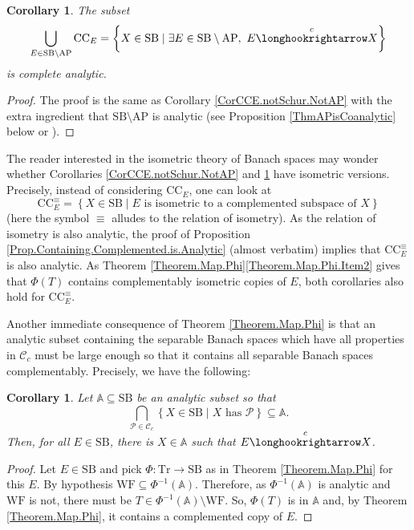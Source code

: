\documentclass[letterpaper]{amsart}
\numberwithin{equation}{section}
\newtheorem{corollary}[theorem]{Corollary}
\theoremstyle{definition}
\newcommand{\WF}{\mathrm{WF}}
\newcommand{\Tr}{\mathrm{Tr}}
\newcommand{\SB}{\mathrm{SB}}
\newcommand{\AP}{\mathrm{AP}}
\begin{document}
\begin{corollary}\label{Corollary.CCE.anyE.CA}
The subset \[\bigcup_{E\in \SB\setminus \AP} \mathrm{CC}_E=\left\{X\in \SB\mid \exists E\in\SB\setminus \AP,\ E\overset{c}{\longhookrightarrow} X\right\}\]    is complete analytic. 
\end{corollary}

\begin{proof}
    The proof is the same as Corollary \ref{CorCCE.notSchur.NotAP} with the extra ingredient that $\SB\setminus \AP$ is analytic  (see Proposition \ref{ThmAPisCoanalytic} below or \cite[Theorem 4.1]{smith2026Studia}).
\end{proof}

The reader interested in the isometric theory of Banach spaces may wonder whether Corollaries \ref{CorCCE.notSchur.NotAP}
 and \ref{Corollary.CCE.anyE.CA} have isometric versions. Precisely, instead of considering $\mathrm{CC}_E$, one can look at 
 \[\mathrm{CC}^{\equiv}_E=\left\{X\in \SB\mid E\text{ is isometric to a complemented subspace of }X\right\}\]
(here the symbol $\equiv$ alludes to the relation of isometry). As the relation of isometry is also analytic, the proof of  Proposition \ref{Prop.Containing.Complemented.is.Analytic} (almost verbatim) implies that   $\mathrm{CC}^{\equiv}_E$ is also analytic. As Theorem \ref{Theorem.Map.Phi}\eqref{Theorem.Map.Phi.Item2} gives that $\Phi(T)$  contains complementably isometric copies of $E$, both corollaries also hold for $\mathrm{CC}^{\equiv}_E$.


Another  immediate consequence of Theorem \ref{Theorem.Map.Phi} is that an analytic subset containing the separable Banach spaces which have all properties in $\mathcal C_c$ must be large enough so that it contains    all separable Banach spaces complementably. Precisely, we have the following:


\begin{corollary}\label{Cor.Analytic.Sub.universal}
Let $\mathbb A\subseteq \SB$ be an analytic subset so that 
\[\bigcap_{\mathcal P\in \mathcal C_c} \left\{X\in \SB\mid X\text{ has }\mathcal P\right\}\subseteq \mathbb A.\]  Then, for all $E\in \SB$, there is  $X\in \mathbb A$ such that $ E\overset{c}{\longhookrightarrow }X$.
\end{corollary}

\begin{proof}
    Let $E\in \SB$ and pick $\Phi\colon \Tr\to \SB$ as in Theorem \ref{Theorem.Map.Phi} for this $E$. By hypothesis  $\WF\subseteq \Phi^{-1}(\mathbb A)$. Therefore, as $\Phi^{-1}(\mathbb A)$ is analytic and $\WF$ is not, there must be $T\in \Phi^{-1}(\mathbb A)\setminus \WF$. So, $\Phi(T)$ is in $\mathbb A$ and, by Theorem \ref{Theorem.Map.Phi}, it contains a complemented copy of $E$.
\end{proof}
\end{document}
